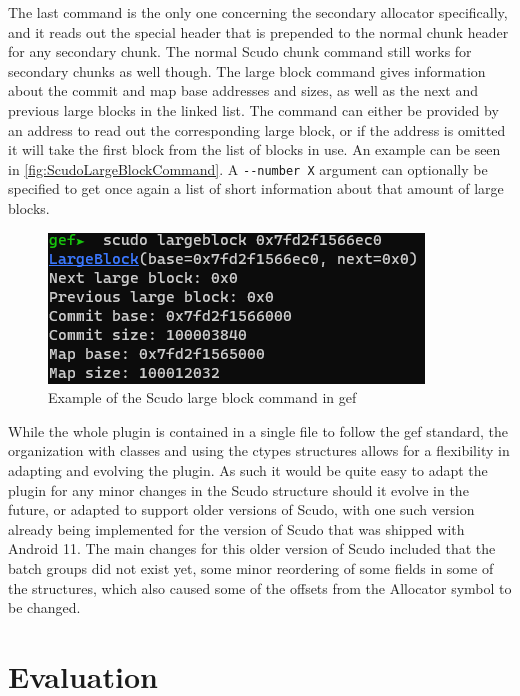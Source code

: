 \documentclass[a4paper,11pt,oneside]{report}
\begin{document}
The last command is the only one concerning the secondary allocator specifically,
and it reads out the special header that is prepended to the normal chunk header
for any secondary chunk. The normal Scudo chunk command still works for secondary
chunks as well though. The large block command gives information about the
commit and map base addresses and sizes, as well as the next and previous large
blocks in the linked list. The command can either be provided by an address
to read out the corresponding large block, or if the address is omitted it will
take the first block from the list of blocks in use. An example can be seen in
\autoref{fig:ScudoLargeBlockCommand}. A \verb|--number X| argument can optionally be
specified to get once again a list of short information about that amount of large
blocks.

\begin{figure}[h!]
  \centering
  \includegraphics{figures/ScudoLargeBlockCommand.png}
  \caption{Example of the Scudo large block command in gef}
  \label{fig:ScudoLargeBlockCommand}
\end{figure}

While the whole plugin is contained in a single file to follow the gef standard,
the organization with classes and using the ctypes structures allows for a
flexibility in adapting and evolving the plugin. As such it would be quite
easy to adapt the plugin for any minor changes in the Scudo structure should
it evolve in the future, or adapted to support older versions of Scudo, with
one such version already being implemented for the version of Scudo that was
shipped with Android 11. The main changes for this older version of Scudo
included that the batch groups did not exist yet, some minor reordering of
some fields in some of the structures, which also caused some of the offsets
from the Allocator symbol to be changed.


\chapter{Evaluation}
\end{document}
